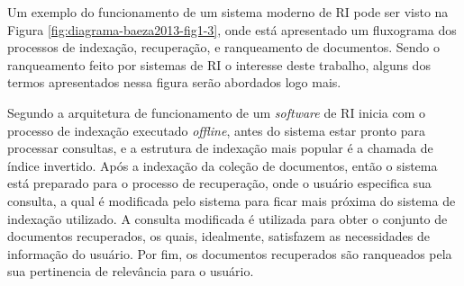     Um exemplo do funcionamento de um sistema moderno de RI pode ser visto na Figura \ref{fig:diagrama-baeza2013-fig1-3}, onde está apresentado um fluxograma dos processos de indexação, recuperação, e ranqueamento de documentos. 
    Sendo o ranqueamento feito por sistemas de RI o interesse deste trabalho, alguns dos termos apresentados nessa figura serão abordados logo mais.
    
    
    
    Segundo  a arquitetura de funcionamento de um \textit{software} de RI inicia com o processo de indexação executado \textit{offline}, antes do sistema estar pronto para processar consultas, e a estrutura de indexação mais popular é a chamada de índice invertido.
    Após a indexação da coleção de documentos, então o sistema está preparado para o processo de recuperação, onde o usuário especifica sua consulta, a qual é modificada pelo sistema para ficar mais próxima do sistema de indexação utilizado.
    A consulta modificada é utilizada para obter o conjunto de documentos recuperados, os quais, idealmente, satisfazem as necessidades de informação do usuário.
    Por fim, os documentos recuperados são ranqueados pela sua pertinencia de relevância para o usuário.
    
    
    
    

